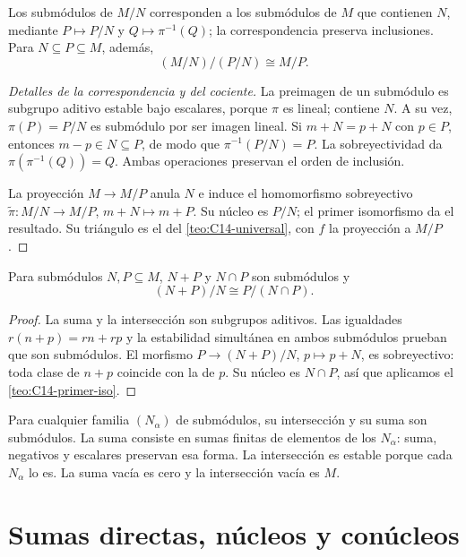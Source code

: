 \begin{prop}\label{prop:C14-correspondencia}
Los submódulos de $M/N$ corresponden a los submódulos de $M$ que contienen $N$, mediante $P\mapsto P/N$ y $Q\mapsto\pi^{-1}(Q)$; la correspondencia preserva inclusiones. Para $N\subseteq P\subseteq M$, además,
\[
(M/N)/(P/N)\cong M/P.
\]
\end{prop}
\begin{proof}[Detalles de la correspondencia y del cociente]
La preimagen de un submódulo es subgrupo aditivo estable bajo escalares, porque $\pi$ es lineal; contiene $N$. A su vez, $\pi(P)=P/N$ es submódulo por ser imagen lineal. Si $m+N=p+N$ con $p\in P$, entonces $m-p\in N\subseteq P$, de modo que $\pi^{-1}(P/N)=P$. La sobreyectividad da $\pi(\pi^{-1}(Q))=Q$. Ambas operaciones preservan el orden de inclusión.

La proyección $M\to M/P$ anula $N$ e induce el homomorfismo sobreyectivo $\widetilde\pi:M/N\to M/P$, $m+N\mapsto m+P$. Su núcleo es $P/N$; el primer isomorfismo da el resultado. Su triángulo es el del \cref{teo:C14-universal}, con $f$ la proyección a $M/P$.
\end{proof}

\begin{prop}\label{prop:C14-segundo-iso}
Para submódulos $N,P\subseteq M$, $N+P$ y $N\cap P$ son submódulos y
\[
(N+P)/N\cong P/(N\cap P).
\]
\end{prop}
\begin{proof}
La suma y la intersección son subgrupos aditivos. Las igualdades $r(n+p)=rn+rp$ y la estabilidad simultánea en ambos submódulos prueban que son submódulos. El morfismo $P\to(N+P)/N$, $p\mapsto p+N$, es sobreyectivo: toda clase de $n+p$ coincide con la de $p$. Su núcleo es $N\cap P$, así que aplicamos el \cref{teo:C14-primer-iso}.
\end{proof}

Para cualquier familia $(N_\alpha)$ de submódulos, su intersección y su suma son submódulos. La suma consiste en sumas finitas de elementos de los $N_\alpha$: suma, negativos y escalares preservan esa forma. La intersección es estable porque cada $N_\alpha$ lo es. La suma vacía es cero y la intersección vacía es $M$.

\section{Sumas directas, núcleos y conúcleos}

